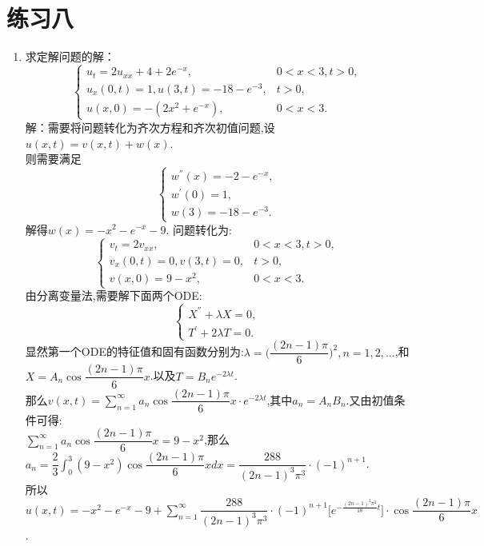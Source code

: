 \documentclass[11pt]{article}
\begin{document}
    \setlength{\topmargin}{-18mm}
\section*{练习八}
    \begin{enumerate}
        \item 求定解问题的解：
           \[
        \left\{
         \begin{array}{lr}
         u_{t}=2u_{xx}+4+2e^{-x},&0<x<3,t>0, \\
         u_x(0,t)=1,u(3,t)=-18-e^{-3},& t>0, \\
         u(x,0)=-(2x^2+e^{-x}),& 0<x<3.
         \end{array}
        \right. \]
            解：需要将问题转化为齐次方程和齐次初值问题,设$u(x,t)=v(x,t)+w(x)$.\\
        则需要满足\[
        \begin{cases}
            w^{''}(x)=-2-e^{-x},\\
            w^{'}(0)=1,\\
            w(3)=-18-e^{-3}.
        \end{cases}
        \]
        解得$w(x)=-x^2-e^{-x}-9$.
        问题转化为:\[
        \left\{
         \begin{array}{lr}
         v_{t}=2v_{xx},&0<x<3,t>0, \\
         v_x(0,t)=0,v(3,t)=0,& t>0, \\
         v(x,0)=9-x^2,& 0<x<3.
         \end{array}
        \right. \]
        由分离变量法,需要解下面两个ODE:\[
        \begin{cases}
            X^{''}+\lambda X=0,\\
            T^{'}+2\lambda T=0.
        \end{cases}
        \]
        显然第一个ODE的特征值和固有函数分别为:$\lambda = \big(\dfrac{(2n-1)\pi}{6}\big)^2,n=1,2,\dots$,和$X=A_n\cos\dfrac{(2n-1)\pi}{6}x$.以及$T=B_{n}e^{-2\lambda t}$.
        \\ 那么$v(x,t)=\sum\limits_{n=1}^{\infty}a_n\cos\dfrac{(2n-1)\pi}{6}x\cdot e^{-2\lambda t}$,其中$a_n=A_nB_n$.又由初值条件可得:\\
        $\sum\limits_{n=1}^{\infty}a_n\cos\dfrac{(2n-1)\pi}{6}x=9-x^2$,那么$a_n=\dfrac{2}{3}\int^{3}_{0}(9-x^2)\cos\dfrac{(2n-1)\pi}{6}xdx=\dfrac{288}{(2n-1)^3\pi^3}\cdot (-1)^{n+1}$.\\所以$u(x,t)=-x^2-e^{-x}-9+\sum\limits_{n=1}^{\infty}\dfrac{288}{(2n-1)^3\pi^3}\cdot (-1)^{n+1}\big[e^{-\frac{(2n-1)^2\pi^2}{18}t}\big]\cdot \cos\dfrac{(2n-1)\pi}{6}x$.




\end{enumerate}
\end{document}
